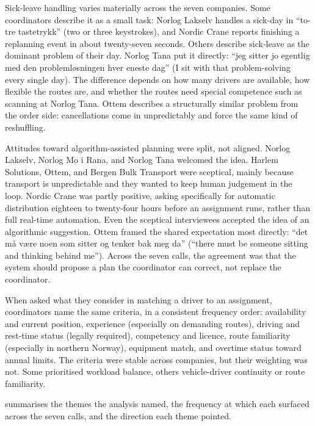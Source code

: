 Sick-leave handling varies materially across the seven companies. Some coordinators describe it as a small task: Norlog Lakselv handles a sick-day in ``to-tre tastetrykk'' (two or three keystrokes), and Nordic Crane reports finishing a replanning event in about twenty-seven seconds. Others describe sick-leave as the dominant problem of their day. Norlog Tana put it directly: ``jeg sitter jo egentlig med den problemløsningen hver eneste dag'' (I sit with that problem-solving every single day). The difference depends on how many drivers are available, how flexible the routes are, and whether the routes need special competence such as scanning at Norlog Tana. Ottem describes a structurally similar problem from the order side: cancellations come in unpredictably and force the same kind of reshuffling.

Attitudes toward algorithm-assisted planning were split, not aligned. Norlog Lakselv, Norlog Mo i Rana, and Norlog Tana welcomed the idea. Harlem Solutions, Ottem, and Bergen Bulk Transport were sceptical, mainly because transport is unpredictable and they wanted to keep human judgement in the loop. Nordic Crane was partly positive, asking specifically for automatic distribution eighteen to twenty-four hours before an assignment runs, rather than full real-time automation. Even the sceptical interviewees accepted the idea of an algorithmic suggestion. Ottem framed the shared expectation most directly: ``det må være noen som sitter og tenker bak meg da'' (``there must be someone sitting and thinking behind me''). Across the seven calls, the agreement was that the system should propose a plan the coordinator can correct, not replace the coordinator.

When asked what they consider in matching a driver to an assignment, coordinators name the same criteria, in a consistent frequency order: availability and current position, experience (especially on demanding routes), driving and rest-time status (legally required), competency and licence, route familiarity (especially in northern Norway), equipment match, and overtime status toward annual limits. The criteria were stable across companies, but their weighting was not. Some prioritised workload balance, others vehicle-driver continuity or route familiarity.

 summarises the themes the analysis named, the frequency at which each surfaced across the seven calls, and the direction each theme pointed.

